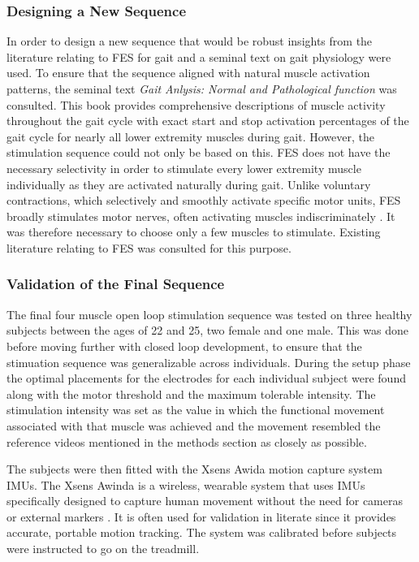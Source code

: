 \subsubsection{Designing a New Sequence}
In order to design a new sequence that would be robust insights from the literature relating to FES for gait and a seminal text on gait physiology were used. To ensure that the sequence aligned with natural muscle activation patterns, the seminal text \textit{Gait Anlysis: Normal and Pathological function} \cite{perry_gait_2024} was consulted. This book provides comprehensive descriptions of muscle activity throughout the gait cycle with exact start and stop activation percentages of the gait cycle for nearly all lower extremity muscles during gait. However, the stimulation sequence could not only be based on this. FES does not have the necessary selectivity in order to stimulate every lower extremity muscle individually as they are activated naturally during gait. Unlike voluntary contractions, which selectively and smoothly activate specific motor units, FES broadly stimulates motor nerves, often activating muscles indiscriminately . It was therefore necessary to choose only a few muscles to stimulate. Existing literature relating to FES was consulted for this purpose.



\subsubsection{Validation of the Final Sequence}
The final four muscle open loop stimulation sequence was tested on three healthy subjects between the ages of 22 and 25, two female and one male. This was done before moving further with closed loop development, to ensure that the stimuation sequence was generalizable across individuals. During the setup phase the optimal placements for the electrodes for each individual subject were found along with the motor threshold and the maximum tolerable intensity. The stimulation intensity was set as the value in which the functional movement associated with that muscle was achieved and the movement resembled the reference videos mentioned in the methods section as closely as possible.

The subjects were then fitted with the Xsens Awida  motion capture system IMUs. The Xsens Awinda is a wireless, wearable system that uses IMUs specifically designed to capture human movement without the need for cameras or external markers \cite{noauthor_mvn_nodate}. It is often used for validation in literate since it provides accurate, portable motion tracking. The system was calibrated before subjects were instructed to go on the treadmill. 

